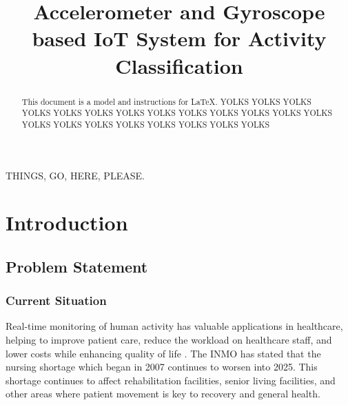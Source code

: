 \documentclass[conference]{IEEEtran}
\begin{document}
\title{Accelerometer and Gyroscope based IoT System for Activity Classification\\
}

\author{
\and
{}
}

\maketitle

\begin{abstract}
This document is a model and instructions for \LaTeX.
YOLKS YOLKS YOLKS YOLKS YOLKS YOLKS YOLKS YOLKS YOLKS YOLKS YOLKS YOLKS YOLKS YOLKS YOLKS YOLKS YOLKS YOLKS YOLKS YOLKS YOLKS 
\end{abstract}

\begin{IEEEkeywords}
THINGS, GO, HERE, PLEASE.
\end{IEEEkeywords}

\section{Introduction}


\subsection{Problem Statement}

\subsubsection{Current Situation}
Real-time monitoring of human activity has valuable applications in healthcare, helping to improve patient care, reduce the workload on healthcare staff, and lower costs while enhancing quality of life \cite{b1}. The INMO has stated that the nursing shortage which began in 2007 continues to worsen into 2025. This shortage continues to affect rehabilitation facilities, senior living facilities, and other areas where patient movement is key to recovery and general health.
\end{document}

